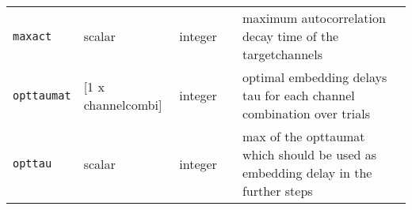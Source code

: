 \begin{table}[H]
{\begin{tabularx}{1.1\textwidth}{p{3cm}L{3cm}p{1.5cm}p{1.1cm}X}
\texttt{maxact} & scalar & integer & & maximum autocorrelation decay time of the targetchannels\\ 
\texttt{opttaumat} & [1 x channelcombi] & integer & & optimal embedding delays tau for each channel combination over trials\\
\texttt{opttau}  & scalar & integer & & max of the opttaumat which should be used as embedding delay in the further steps\\ \bottomrule
\end{tabularx}} \label{tab:TEprepare}
\end{table}
